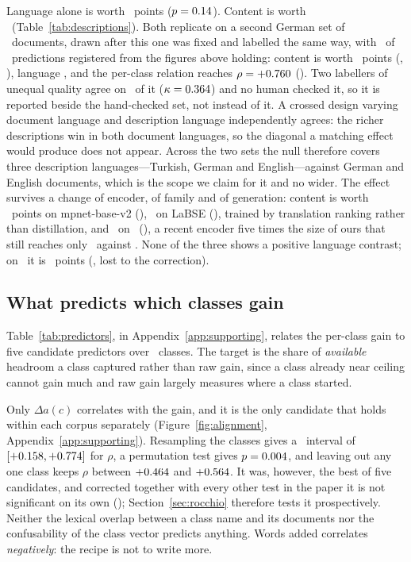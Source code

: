 \documentclass[11pt]{article}
\begin{document}
Language alone is worth \LanguageEffect~points ($p = 0.14$). Content is
worth \ContentEffect\ (Table~\ref{tab:descriptions}). Both replicate on a second German set of
\ExtendedN\ documents, drawn after this one was fixed and labelled the same
way, with \ExtendedHeld\ of \ExtendedPredictions\ predictions registered from
the figures above holding: content is worth \ExtendedContentGain~points
(\ExtendedContentPStat, \HolmExtendedContentStat), language
\ExtendedLanguageGain, and the per-class relation reaches
$\rho = +0.760$ (\HolmExtendedRhoStat). Two labellers of unequal quality
agree on \ExtendedAgreement\ of it ($\kappa = 0.364$) and no human
checked it, so it is reported beside the hand-checked set, not instead of it. A crossed design varying document language and description
language independently agrees: the richer descriptions win in both document
languages, so the diagonal a matching effect would produce does not appear.
Across the two sets the null therefore covers three description
languages---Turkish, German and English---against German and English
documents, which is the scope we claim for it and no wider. The
effect survives a change of encoder, of family and of generation: content is
worth \MpnetContentEffect~points on mpnet-base-v2 (\MpnetContentPStat),
\LabseContentEffect\ on LaBSE (\LabseContentPStat), trained by translation
ranking rather than distillation, and \BgeContentEffect\ on \BgeModel\
(\BgeContentPStat), a recent encoder five times the size of ours that still
reaches only \BgeTopOne\ against \OursTopOne. None of the three shows a
positive language contrast; on \BgeModel\ it is
\BgeLanguageEffect~points (\BgeLanguagePStat, lost to the correction).

\subsection{What predicts which classes gain}
\label{sec:predictors}

Table~\ref{tab:predictors}, in Appendix~\ref{app:supporting}, relates the per-class gain to five candidate
predictors over \NCLASSES\ classes. The target is the share of \emph{available}
headroom a class captured rather than raw gain, since a class already near
ceiling cannot gain much and raw gain largely measures where a class started.

Only $\Delta a(c)$ correlates with the gain, and it is the only candidate that
holds within each corpus separately (Figure~\ref{fig:alignment},
Appendix~\ref{app:supporting}). Resampling the classes gives a
\CILevel\ interval of $[+0.158, +0.774]$ for $\rho$, a permutation test
gives $p = 0.004$, and leaving out any one class keeps $\rho$ between
$+0.464$ and $+0.564$. It was, however, the best of five candidates,
and corrected together with every other test in the paper it is not significant
on its own (\HolmAlignStat); Section~\ref{sec:rocchio} therefore tests it
prospectively. Neither the lexical overlap between a class name and its
documents nor the confusability of the class vector predicts anything. Words
added correlates \emph{negatively}: the recipe is not to write more.
\end{document}
